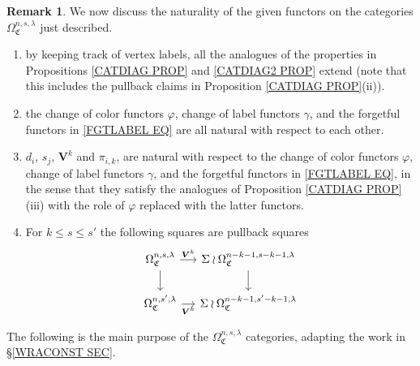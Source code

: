 \documentclass[a4paper,10pt
,draft
]{article}%
\numberwithin{equation}{section}
\numberwithin{figure}{section}
\theoremstyle{definition} %
\newtheorem{remark}[equation]{Remark}%
\newcommand{\1}{\ensuremath{\mathbbm 1}}%
\begin{document}
\begin{remark}
	We now discuss the naturality of the given functors on the categories
	$\Omega_{\mathfrak{C}}^{n,s,\lambda}$ just described.
	\begin{enumerate}[label=(\roman*)]
		\item by keeping track of vertex labels, all the analogues of the properties in Propositions \ref{CATDIAG PROP} and \ref{CATDIAG2 PROP} extend (note that this includes the pullback claims in 
		Proposition \ref{CATDIAG PROP}(ii)).
		\item the change of color functors $\varphi$, change of label functors $\gamma$, and the forgetful functors in
		\eqref{FGTLABEL EQ} are all natural with respect to each other.
		\item $d_i$, $s_j$, $\boldsymbol{V}^k$
		and $\pi_{i,k}$, are natural with respect to the change of color functors $\varphi$, change of label functors $\gamma$, and the forgetful functors in
		\eqref{FGTLABEL EQ}, 
		in the sense that they satisfy the analogues of  
		Proposition \ref{CATDIAG PROP}(iii) with 
		the role of $\varphi$ replaced with the latter functors.
		\item
		For $k \leq s \leq s'$ the following squares are pullback squares
		\[
		\begin{tikzcd}[column sep = small, row sep = small]
		\Omega^{n,s,\lambda}_{\mathfrak{C}} \ar{r}{\boldsymbol{V}^k} \ar{dd} &
		\Sigma \wr \Omega^{n-k-1,s-k-1,\lambda}_{\mathfrak{C}} \ar{dd}
		\\
		\\
		\Omega^{n,s',\lambda}_{\mathfrak{C}} \ar{r}[swap]{\boldsymbol{V}^k} &
		\Sigma \wr \Omega^{n-k-1,s'-k-1,\lambda}_{\mathfrak{C}}
		\end{tikzcd}
		\]
	\end{enumerate}
\end{remark}

The following is the main purpose of the 
$\Omega_{\mathfrak{C}}^{n,s,\lambda}$ categories,
adapting the work in \S \ref{WRACONST SEC}.
\end{document}
